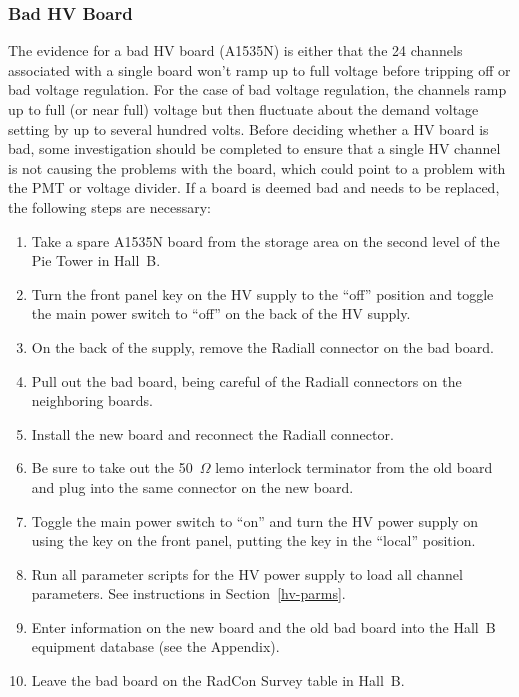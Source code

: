 \documentclass[12pt]{article}
\begin{document}
\subsubsection{Bad HV Board}
\label{board-swap}

The evidence for a bad HV board (A1535N) is either that the 24 channels associated with a single 
board won't ramp up to full voltage before tripping off or bad voltage regulation. For the case
of bad voltage regulation, the channels ramp up to full (or near full) voltage but then fluctuate 
about the demand voltage setting by up to several hundred volts. Before deciding whether a HV 
board is bad, some investigation should be completed to ensure that a single HV channel is not 
causing the problems with the board, which could point to a problem with the PMT or voltage 
divider. If a board is deemed bad and needs to be replaced, the following steps are necessary:

\begin{enumerate}
\item Take a spare A1535N board from the storage area on the second level of the Pie Tower in 
Hall~B.
\item Turn the front panel key on the HV supply to the ``off'' position and toggle the main power 
switch to ``off'' on the back of the HV supply.
\item On the back of the supply, remove the Radiall connector on the bad board.
\item Pull out the bad board, being careful of the Radiall connectors on the neighboring boards.
\item Install the new board and reconnect the Radiall connector.
\item Be sure to take out the 50~$\Omega$ lemo interlock terminator from the old board and plug 
into the same connector on the new board.
\item Toggle the main power switch to ``on'' and turn the HV power supply on using the key on the 
front panel, putting the key in the ``local'' position.
\item Run all parameter scripts for the HV power supply to load all channel parameters. See 
instructions in Section~\ref{hv-parms}.
\item Enter information on the new board and the old bad board into the Hall~B equipment database 
(see the Appendix).
\item Leave the bad board on the RadCon Survey table in Hall~B.
\end{enumerate}
\end{document}
